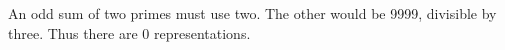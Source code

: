 An odd sum of two primes must use two. The other would be 9999, divisible by three. Thus there are $\boxed0$ representations.
